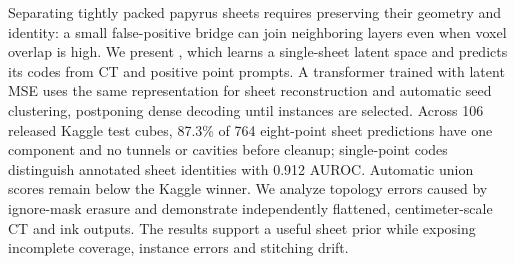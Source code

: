 Separating tightly packed papyrus sheets requires preserving their geometry
and identity: a small false-positive bridge can join neighboring layers even
when voxel overlap is high. We present \pLatS{}, which learns a single-sheet
latent space and predicts its codes from CT and positive point prompts.
A transformer trained with latent MSE uses the same representation for sheet
reconstruction and automatic seed clustering, postponing dense decoding until
instances are selected. Across 106 released Kaggle test cubes, 87.3\% of 764
eight-point sheet predictions have one component and no tunnels or cavities
before cleanup; single-point codes distinguish annotated sheet identities
with 0.912 AUROC. Automatic union scores remain below the Kaggle winner.
We analyze topology errors caused by ignore-mask erasure and demonstrate
independently flattened, centimeter-scale CT and ink outputs. The results
support a useful sheet prior while exposing incomplete coverage, instance
errors and stitching drift.
